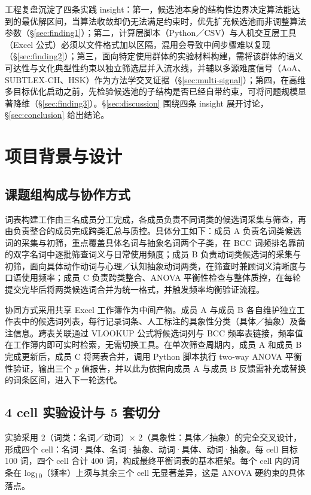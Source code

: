 \documentclass[12pt, a4paper]{article}
\begin{document}
工程复盘沉淀了四条实践 insight：第一，候选池本身的结构性边界决定算法能达到的最优解区间，当算法收敛却仍无法满足约束时，优先扩充候选池而非调整算法参数（\S\ref{sec:finding1}）；第二，计算层脚本（Python／CSV）与人机交互层工具（Excel 公式）必须以文件格式加以区隔，混用会导致中间步骤难以复现（\S\ref{sec:finding2}）；第三，面向特定使用群体的实验材料构建，需将该群体的语义可达性与文化典型性约束以独立筛选层并入流水线，并辅以多源难度信号（AoA、SUBTLEX-CH、HSK）作为方法学交叉证据（\S\ref{sec:multi-signal}）；第四，在高维多目标优化启动之前，先检验候选池的子结构是否已经自带约束，可将问题规模显著降维（\S\ref{sec:finding3}）。\S\ref{sec:discussion} 围绕四条 insight 展开讨论，\S\ref{sec:conclusion} 给出结论。

\section{项目背景与设计}
\label{sec:background}

\subsection{课题组构成与协作方式}

词表构建工作由三名成员分工完成，各成员负责不同词类的候选词采集与筛查，再由负责整合的成员完成跨类汇总与质控。具体分工如下：成员 A 负责名词类候选词的采集与初筛，重点覆盖具体名词与抽象名词两个子类，在 BCC 词频排名靠前的双字名词中逐批筛查词义与日常使用频度；成员 B 负责动词类候选词的采集与初筛，面向具体动作动词与心理／认知抽象动词两类，在筛查时兼顾词义清晰度与口语使用频率；成员 C 负责跨类整合、ANOVA 平衡性检查与整体质控，在每轮提交完毕后将两类候选词合并为统一格式，并触发频率均衡验证流程。

协同方式采用共享 Excel 工作簿作为中间产物。成员 A 与成员 B 各自维护独立工作表中的候选词列表，每行记录词条、人工标注的具象性分类（具体／抽象）及备注信息。跨表关联通过 VLOOKUP 公式将候选词列与 BCC 频率表链接，频率值在工作簿内即可实时检索，无需切换工具。在单次筛查周期内，成员 A 和成员 B 完成更新后，成员 C 将两表合并，调用 Python 脚本执行 two-way ANOVA 平衡性验证，输出三个 \textit{p} 值报告，并以此为依据向成员 A 与成员 B 反馈需补充或替换的词条区间，进入下一轮迭代。

\subsection{4 cell 实验设计与 5 套切分}

实验采用 2（词类：名词／动词）× 2（具象性：具体／抽象）的完全交叉设计，形成四个 cell：名词·具体、名词·抽象、动词·具体、动词·抽象。每 cell 目标 100 词，四个 cell 合计 400 词，构成最终平衡词表的基本框架。每个 cell 内的词条在 log\textsubscript{10}（频率）上须与其余三个 cell 无显著差异，这是 ANOVA 硬约束的具体落点。
\end{document}
